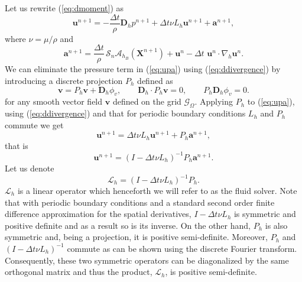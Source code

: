 \documentclass[preprint,12pt]{elsarticle}
\begin{document}
Let us rewrite (\ref{eq:dmoment}) as
\begin{equation}
\mathbf{u}^{n+1}=-\frac{\Delta t}{\rho} \mathbf{D}_h p^{n+1} + \Delta t \nu L_h \mathbf{u}^{n+1} + \mathbf{a}^{n+1},
\label{eq:upa}
\end{equation}
where $\nu=\mu/\rho$ and
\begin{equation}
\mathbf{a}^{n+1}= \frac{\Delta t}{\rho}\, \mathcal{S}_n\mathcal{A}_{h_B}(\mathbf{X}^{n+1})+\mathbf{u}^n-\Delta t \, \, \mathbf{u}^n \cdot \nabla_h \mathbf{u}^n. \label{eq:a}
\end{equation}
We can eliminate the pressure term in (\ref{eq:upa}) using (\ref{eq:ddivergence}) by introducing a discrete projection
$P_h$ defined as 
\begin{equation}
\mathbf{v} = P_h \mathbf{v} + \mathbf{D}_h \phi_v, \qquad \mathbf{D}_h \cdot P_h \mathbf{v} =0, \qquad P_h \mathbf{D}_h \phi_v=0.
\end{equation}
for any smooth vector field $\mathbf{v}$ defined on the grid $\mathcal{G}_{\Omega}$. Applying $P_h$ to (\ref{eq:upa}), using  (\ref{eq:ddivergence}) and that for periodic boundary conditions $L_h$ and $P_h$ commute we get
\begin{equation}
\mathbf{u}^{n+1}= \Delta t \nu L_h \mathbf{u}^{n+1} + P_h \mathbf{a}^{n+1},
\end{equation}
that is
\begin{equation}
\mathbf{u}^{n+1} = (I -\Delta t \nu L_h)^{-1}  P_h \mathbf{a}^{n+1}.
\end{equation}
Let us denote
\begin{equation}
\mathcal{L}_h = (I -\Delta t \nu L_h)^{-1}  P_h. \label{eq:L_h}
\end{equation}
$\mathcal{L}_h$ is a linear operator which henceforth we will refer to as the fluid solver. Note that with periodic boundary conditions and a standard second order finite difference approximation for the spatial derivatives,
  $I -\Delta t \nu L_h$ is symmetric and positive definite and as a result so is its inverse. 
  On the other hand, $P_h$ is also symmetric and, being 
  a projection, it is positive semi-definite. Moreover, $P_h$ and $(I -\Delta t \nu L_h)^{-1}$ commute 
  as can be shown using the discrete Fourier transform. Consequently, these two symmetric operators can be diagonalized by the same orthogonal matrix and thus the product, $\mathcal{L}_h $, is positive semi-definite. 
\end{document}
